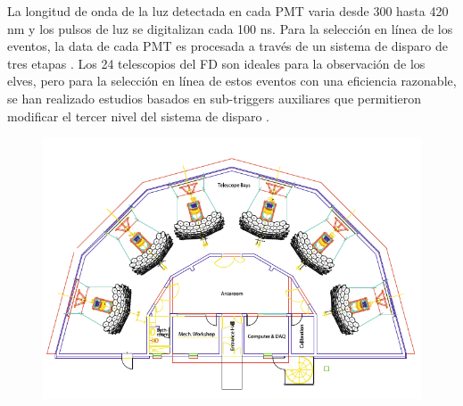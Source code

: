 \documentclass[12pt,oneside,openany,letter]{book}
\begin{document}
La longitud de onda de la luz detectada en cada PMT varia desde 300 hasta 420 nm y los pulsos de luz se digitalizan cada 100 ns. Para la selección en línea de los eventos, la data de cada PMT es procesada a través de un sistema de disparo de tres etapas \cite{MussaCiaccio2012}. Los 24 telescopios del FD son ideales para la observación de los elves, pero para la selecci\'on en línea de estos eventos con una eficiencia razonable, se han realizado estudios basados en sub-triggers auxiliares que permitieron modificar el tercer nivel del sistema de disparo \cite{Mussa2019}.

\begin{figure}
    \centering
    \includegraphics[scale=0.5]{figures/eye_scheme.png}
    

\end{figure}
\end{document}
